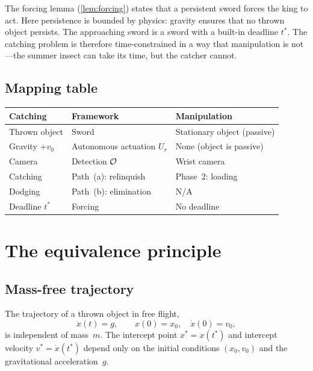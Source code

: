 \begin{remark}
The forcing lemma (\cref{lem:forcing}) states that a persistent
sword forces the king to act.  Here persistence is bounded by
physics: gravity ensures that no thrown object persists.  The
approaching sword is a sword with a built-in deadline $t^*$.
The catching problem is therefore time-constrained in a way that
manipulation is not---the summer insect can take its time, but
the catcher cannot.
\end{remark}

\subsection{Mapping table}

\begin{center}
\begin{tabular}{@{}lll@{}}
\toprule
\textbf{Catching} & \textbf{Framework} & \textbf{Manipulation} \\
\midrule
Thrown object & Sword & Stationary object (passive) \\
Gravity $+ v_0$ & Autonomous actuation $U_r$ & None (object is passive) \\
Camera & Detection $\mathcal{O}$ & Wrist camera \\
Catching & Path~(a): relinquish & Phase~2: loading \\
Dodging & Path~(b): elimination & N/A \\
Deadline $t^*$ & Forcing & No deadline \\
\bottomrule
\end{tabular}
\end{center}


\section{The equivalence principle}
\label{sec:c-equivalence}

\subsection{Mass-free trajectory}

\begin{proposition}
\label{prop:c-massfree}
The trajectory of a thrown object in free flight,
\[
  \ddot{x}(t) = g,\qquad
  x(0) = x_0,\quad \dot{x}(0) = v_0,
\]
is independent of mass~$m$.  The intercept point
$x^* = x(t^*)$ and intercept velocity $v^* = \dot{x}(t^*)$
depend only on the initial conditions $(x_0, v_0)$ and the
gravitational acceleration~$g$.
\end{proposition}

